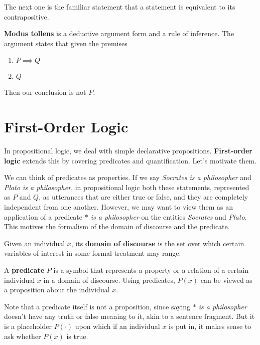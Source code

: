\documentclass{article}
\begin{document}
    The next one is the familiar statement that a statement is equivalent to its contrapositive. 

    \begin{definition}
      \textbf{Modus tollens} is a deductive argument form and a rule of inference. The argument states that given the premises 
      \begin{enumerate}
        \item $P \implies Q$ 
        \item $Q$ 
      \end{enumerate}
      Then our conclusion is not $P$. 
    \end{definition}

\section{First-Order Logic} 

  In propositional logic, we deal with simple declarative propositions. \textbf{First-order logic} extends this by covering predicates and quantification. Let's motivate them. 

  We can think of predicates as properties. If we say \textit{Socrates is a philosopher} and \textit{Plato is a philosopher}, in propositional logic both these statements, represented as $P$ and $Q$, as utterances that are either true or false, and they are completely independent from one another. However, we may want to view them as an application of a predicate \textit{ $\ast$ is a philosopher} on the entities \textit{Socrates} and \textit{Plato}. This motives the formalism of the domain of discourse and the predicate. 

  \begin{definition}
    Given an individual $x$, its \textbf{domain of discourse} is the set over which certain variables of interest in some formal treatment may range. 
  \end{definition}

  \begin{definition}[Predicate]
    A \textbf{predicate} $P$ is a symbol that represents a property or a relation of a certain individual $x$ in a domain of discourse. Using predicates, $P(x)$ can be viewed as a proposition about the individual $x$. 
  \end{definition} 

  Note that a predicate itself is not a proposition, since saying \textit{$\ast$ is a philosopher} doesn't have any truth or false meaning to it, akin to a sentence fragment. But it is a placeholder $P(\cdot)$ upon which if an individual $x$ is put in, it makes sense to ask whether $P(x)$ is true. 
\end{document}
